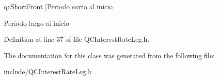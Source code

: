 \begin{Desc}
\begin{description}
{\hypertarget{class_q_c_interest_rate_leg_a70e636ef79eb9bc4c6b84ea526e56521a44b8519b515a711742b848de497f8fb7}{qc\+Short\+Front}\label{class_q_c_interest_rate_leg_a70e636ef79eb9bc4c6b84ea526e56521a44b8519b515a711742b848de497f8fb7}
}]Periodo corto al inicio \item[{\em 
\hypertarget{class_q_c_interest_rate_leg_a70e636ef79eb9bc4c6b84ea526e56521a450dca2a6a27aa9cc77d4e9d2db0f65c}{qc\+Long\+Front}\label{class_q_c_interest_rate_leg_a70e636ef79eb9bc4c6b84ea526e56521a450dca2a6a27aa9cc77d4e9d2db0f65c}
}]Periodo largo al inicio \end{description}
\end{Desc}


Definition at line 37 of file Q\+C\+Interest\+Rate\+Leg.\+h.



The documentation for this class was generated from the following file\+:\begin{DoxyCompactItemize}
\item 
include/Q\+C\+Interest\+Rate\+Leg.\+h\end{DoxyCompactItemize}
